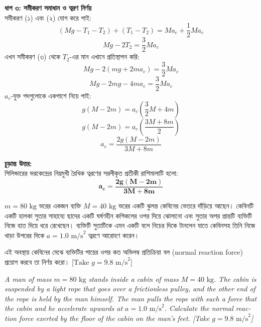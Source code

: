 \documentclass[12pt, a4paper]{article}
\begin{document}
\begin{tcolorbox}[solutionbox={সমাধান (Solution)}]
\vspace{0.5em}
\noindent
\textbf{ধাপ ৩: সমীকরণ সমাধান ও ত্বরণ নির্ণয়} \\
সমীকরণ (১) এবং (২) যোগ করে পাই:
$$(M g - T_1 - T_2) + (T_1 - T_2) = M a_c + \frac{1}{2} M a_c$$
$$M g - 2 T_2 = \frac{3}{2} M a_c$$
এখন সমীকরণ (৩) থেকে $T_2$-এর মান এখানে প্রতিস্থাপন করি:
$$M g - 2(m g + 2 m a_c) = \frac{3}{2} M a_c$$
$$M g - 2 m g - 4 m a_c = \frac{3}{2} M a_c$$
$a_c$-যুক্ত পদগুলোকে একপাশে নিয়ে পাই:
$$g(M - 2m) = a_c \left( \frac{3}{2} M + 4 m \right)$$
$$g(M - 2m) = a_c \left( \frac{3 M + 8 m}{2} \right)$$
$$a_c = \frac{2 g (M - 2 m)}{3 M + 8 m}$$

\vspace{1em}
\begin{tcolorbox}[answerbox]
\textbf{চূড়ান্ত উত্তর:} \\
সিলিন্ডারের ভরকেন্দ্রের নিম্নমুখী রৈখিক ত্বরণের সরলীকৃত প্রতীকী রাশিমালাটি হলো:
\[ \mathbf{a_c = \frac{2 g (M - 2 m)}{3 M + 8 m}} \]
\end{tcolorbox}
\end{tcolorbox}


\begin{tcolorbox}[questionbox={প্রশ্ন (Question) 14}]
\noindent
$m = 80\text{ kg}$ ভরের একজন ব্যক্তি $M = 40\text{ kg}$ ভরের একটি ঝুলন্ত কেবিনের ভেতরে দাঁড়িয়ে আছেন। কেবিনটি একটি হালকা সুতার সাহায্যে ছাদের একটি ঘর্ষণহীন কপিকলের ওপর দিয়ে ঝোলানো এবং সুতার অপর প্রান্তটি ব্যক্তিটি নিজে হাত দিয়ে ধরে রেখেছেন। ব্যক্তিটি সুতাটিকে এমন একটি বলে নিচের দিকে টানলেন যাতে কেবিনসহ তিনি নিজে খাড়া উপরের দিকে $a = 1.0\text{ m/s}^2$ ত্বরণে আরোহণ করেন। 

\vspace{0.3em}
\noindent
এই অবস্থায় কেবিনের মেঝে ব্যক্তিটির পায়ের ওপর কত অভিলম্ব প্রতিক্রিয়া বল (normal reaction force) প্রয়োগ করবে তা নির্ণয় করো। [$\text{Take } g = 9.8\text{ m/s}^2$]

\vspace{0.8em}
\begin{english}
\noindent\textit{\color{darkgray}
A man of mass $m = 80\text{ kg}$ stands inside a cabin of mass $M = 40\text{ kg}$. The cabin is suspended by a light rope that goes over a frictionless pulley, and the other end of the rope is held by the man himself. The man pulls the rope with such a force that the cabin and he accelerate upwards at $a = 1.0\text{ m/s}^2$. Calculate the normal reaction force exerted by the floor of the cabin on the man's feet. [Take $g = 9.8\text{ m/s}^2$]
}
\end{english}
\end{tcolorbox}
\end{document}
